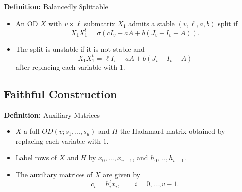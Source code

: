 \documentclass{beamer}
\begin{document}
\begin{frame}

  \begin{block}{{\bf Definition:} Balancedly Splittable \cite[][]{split-od}} 
    \begin{itemize}
    \item An OD $X$ with $v \times \ell$ submatrix $X_1$ admits a stable
      $(v,\ell,a,b)$ split if
      $$
      X_1X_1^t = \sigma(cI_v + aA + b(J_v-I_v-A)).
      $$
    \item The split is unstable if it is not stable and
      $$
      X_1X_1^t = \ell I_v + aA + b(J_v-I_v-A)
      $$
      after replacing each variable with $1$.
    \end{itemize}
  \end{block}
  
\end{frame}


\subsection{Faithful Construction}

\begin{frame}

  \begin{block}{{\bf Definition:} Auxiliary Matrices}
    \begin{itemize}
    \item $X$ a full $OD(v;s_1, \dots, s_u)$ and $H$ the Hadamard matrix
      obtained by replacing each variable with $1$.
    \item Label rows of $X$ and $H$ by $x_0, \dots, x_{v-1}$, and
      $h_0, \dots, h_{v-1}$.
    \item The auxiliary matrices of $X$ are given by
      $$
      c_i = h_i^tx_i, \qquad i = 0, \dots, v-1. 
      $$
    \end{itemize}
  \end{block}

\end{frame}
\end{document}
